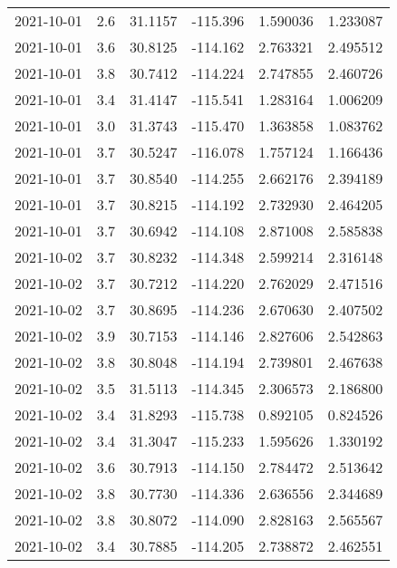 \begin{tabular}{lrrrrr}
2021-10-01 &       2.6 &  31.1157 &  -115.396 &         1.590036 &         1.233087 \\
2021-10-01 &       3.6 &  30.8125 &  -114.162 &         2.763321 &         2.495512 \\
2021-10-01 &       3.8 &  30.7412 &  -114.224 &         2.747855 &         2.460726 \\
2021-10-01 &       3.4 &  31.4147 &  -115.541 &         1.283164 &         1.006209 \\
2021-10-01 &       3.0 &  31.3743 &  -115.470 &         1.363858 &         1.083762 \\
2021-10-01 &       3.7 &  30.5247 &  -116.078 &         1.757124 &         1.166436 \\
2021-10-01 &       3.7 &  30.8540 &  -114.255 &         2.662176 &         2.394189 \\
2021-10-01 &       3.7 &  30.8215 &  -114.192 &         2.732930 &         2.464205 \\
2021-10-01 &       3.7 &  30.6942 &  -114.108 &         2.871008 &         2.585838 \\
2021-10-02 &       3.7 &  30.8232 &  -114.348 &         2.599214 &         2.316148 \\
2021-10-02 &       3.7 &  30.7212 &  -114.220 &         2.762029 &         2.471516 \\
2021-10-02 &       3.7 &  30.8695 &  -114.236 &         2.670630 &         2.407502 \\
2021-10-02 &       3.9 &  30.7153 &  -114.146 &         2.827606 &         2.542863 \\
2021-10-02 &       3.8 &  30.8048 &  -114.194 &         2.739801 &         2.467638 \\
2021-10-02 &       3.5 &  31.5113 &  -114.345 &         2.306573 &         2.186800 \\
2021-10-02 &       3.4 &  31.8293 &  -115.738 &         0.892105 &         0.824526 \\
2021-10-02 &       3.4 &  31.3047 &  -115.233 &         1.595626 &         1.330192 \\
2021-10-02 &       3.6 &  30.7913 &  -114.150 &         2.784472 &         2.513642 \\
2021-10-02 &       3.8 &  30.7730 &  -114.336 &         2.636556 &         2.344689 \\
2021-10-02 &       3.8 &  30.8072 &  -114.090 &         2.828163 &         2.565567 \\
2021-10-02 &       3.4 &  30.7885 &  -114.205 &         2.738872 &         2.462551 \\

\end{tabular}
